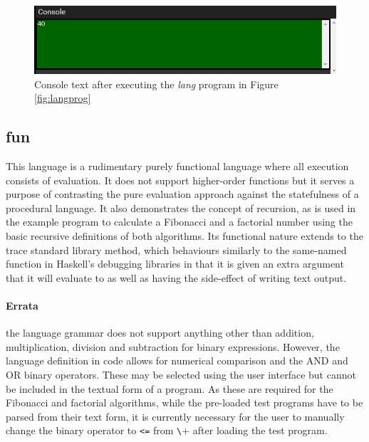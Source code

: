 \begin{figure}[H]
\centering
\includegraphics[scale=0.5]{graphics/langconsole} %
\caption{Console text after executing the \textit{lang} program in Figure \ref{fig:langprog}}
\label{fig:langconsole} %
\end{figure}

\subsection{fun}

This language is a rudimentary purely functional language where all execution consists of evaluation. It does not support higher-order functions but it serves a purpose of contrasting the pure evaluation approach against the statefulness of a procedural language. It also demonstrates the concept of recursion, as is used in the example program to calculate a Fibonacci and a factorial number using the basic recursive definitions of both algorithms. Its functional nature extends to the trace standard library method, which behaviours similarly to the same-named function in Haskell's debugging libraries in that it is given an extra argument that it will evaluate to as well as having the side-effect of writing text output.

\paragraph{Errata} the language grammar does not support anything other than addition, multiplication, division and subtraction for binary expressions. However, the language definition in code allows for numerical comparison and the AND and OR binary operators. These may be selected using the user interface but cannot be included in the textual form of a program. As these are required for the Fibonacci and factorial algorithms, while the pre-loaded test programs have to be parsed from their text form, it is currently necessary for the user to manually change the binary operator to \verb+<=+ from \verb+\++ after loading the test program.


